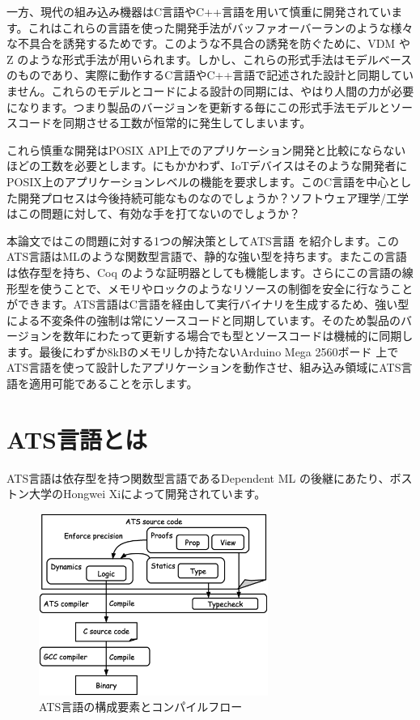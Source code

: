 \documentclass{ipsjprosym}
\begin{document}
一方、現代の組み込み機器はC言語やC++言語を用いて慎重に開発されています。これはこれらの言語を使った開発手法がバッファオーバーランのような様々な不具合を誘発するためです。このような不具合の誘発を防ぐために、VDM \cite{vdm} やZ \cite{z_notation} のような形式手法が用いられます。しかし、これらの形式手法はモデルベースのものであり、実際に動作するC言語やC++言語で記述された設計と同期していません。これらのモデルとコードによる設計の同期には、やはり人間の力が必要になります。つまり製品のバージョンを更新する毎にこの形式手法モデルとソースコードを同期させる工数が恒常的に発生してしまいます。

これら慎重な開発はPOSIX API上でのアプリケーション開発と比較にならないほどの工数を必要とします。にもかかわず、IoTデバイスはそのような開発者にPOSIX上のアプリケーションレベルの機能を要求します。このC言語を中心とした開発プロセスは今後持続可能なものなのでしょうか？ソフトウェア理学/工学はこの問題に対して、有効な手を打てないのでしょうか？

本論文ではこの問題に対する1つの解決策としてATS言語 \cite{ats} を紹介します。このATS言語はMLのような関数型言語で、静的な強い型を持ちます。またこの言語は依存型を持ち、Coq \cite{Coq_manual} のような証明器としても機能します。さらにこの言語の線形型を使うことで、メモリやロックのようなリソースの制御を安全に行なうことができます。ATS言語はC言語を経由して実行バイナリを生成するため、強い型による不変条件の強制は常にソースコードと同期しています。そのため製品のバージョンを数年にわたって更新する場合でも型とソースコードは機械的に同期します。最後にわずか8kBのメモリしか持たないArduino Mega 2560ボード \cite{arduino-mega} 上でATS言語を使って設計したアプリケーションを動作させ、組み込み領域にATS言語を適用可能であることを示します。

\section{ATS言語とは}

ATS言語は依存型を持つ関数型言語であるDependent ML \cite{Dependent-ML-Thesis} の後継にあたり、ボストン大学のHongwei Xiによって開発されています。

\begin{figure}[h]
\centering
\includegraphics[width=75mm]{draw/flow.eps}
\caption{ATS言語の構成要素とコンパイルフロー}
\label{fig:flow}
\end{figure}
\end{document}
